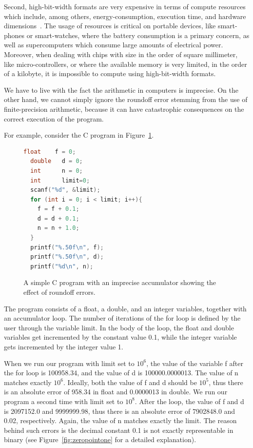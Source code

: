 Second, high-bit-width formats are very expensive in terms of compute resources which include, among others, energy-consumption, execution time, and hardware dimensions~\cite{fppower, lutnet}. 
%
The usage of resources is critical on portable devices, like smart-phones or smart-watches, where the battery consumption is a primary concern, as well as supercomputers which consume large amounts of electrical power.
%
Moreover, when dealing with chips with size in the order of square millimeter, like micro-controllers, or where the available memory is very limited, in the order of a kilobyte, it is impossible to compute using high-bit-width formats.

%
We have to live with the fact the arithmetic in computers is imprecise.
%
On the other hand, we cannot simply ignore the roundoff error stemming from the use of finite-precision arithmetic, because it can have catastrophic consequences on the correct execution of the program.
%

For example, consider the C program in Figure~\ref{fig:while}.
%
\begin{figure}[tb!]
	\begin{lstlisting}[frame=single, language=c]
  float    f = 0;
  double   d = 0;
  int      n = 0;
  int      limit=0;
  scanf("%d", &limit);
  for (int i = 0; i < limit; i++){
    f = f + 0.1;
    d = d + 0.1;
    n = n + 1.0;
  }
  printf("%.50f\n", f);
  printf("%.50f\n", d);
  printf("%d\n", n);
	\end{lstlisting}
	\caption{A simple C program with an imprecise accumulator showing the effect of roundoff errors.}\label{fig:while}
\end{figure}
%
The program consists of a float, a double, and an integer variables, together with an accumulator loop.
%
The number of iterations of the for loop is defined by the user through the variable limit.
%
In the body of the loop, the float and double variables get incremented by the constant value 0.1, while the integer variable gets incremented by the integer value 1.
%

When we run our program with limit set to $10^6$, the value of the variable f after the for loop is 100958.34, and the value of d is 100000.0000013. The value of n matches exactly $10^6$.
%
Ideally, both the value of f and d should be $10^5$, thus there is an absolute error of 958.34 in float and 0.0000013 in double.
%
We run our program a second time with limit set to $10^8$. 
%
After the loop, the value of f and d is 2097152.0 and 9999999.98, thus there is an absolute error of 7902848.0 and 0.02, respectively. 
%
Again, the value of n matches exactly the limit.
%
The reason behind such errors is the decimal constant 0.1 is not exactly representable in binary (see Figure~\ref{fig:zeropointone} for a detailed explanation). 

